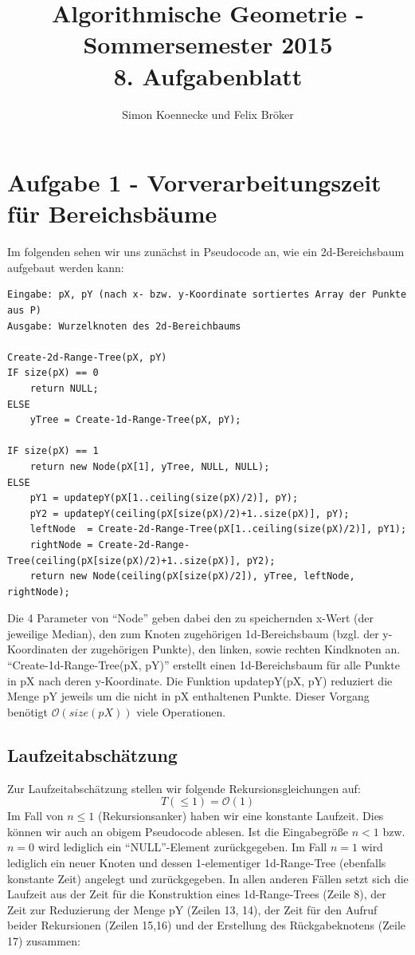 \documentclass[a4paper]{article}
\begin{document}
\title{Algorithmische Geometrie - Sommersemester 2015\\
       8. Aufgabenblatt }
\author{Simon Koennecke und Felix Bröker}
\date{}
\maketitle

\section*{Aufgabe 1 - Vorverarbeitungszeit für Bereichsbäume}

Im folgenden sehen wir uns zunächst in Pseudocode an, 
wie ein 2d-Bereichsbaum aufgebaut werden kann:

\begin{lstlisting}
Eingabe: pX, pY (nach x- bzw. y-Koordinate sortiertes Array der Punkte aus P)
Ausgabe: Wurzelknoten des 2d-Bereichbaums

Create-2d-Range-Tree(pX, pY)
IF size(pX) == 0
	return NULL;
ELSE
	yTree = Create-1d-Range-Tree(pX, pY);

IF size(pX) == 1
	return new Node(pX[1], yTree, NULL, NULL);
ELSE
	pY1 = updatepY(pX[1..ceiling(size(pX)/2)], pY);
	pY2 = updatepY(ceiling(pX[size(pX)/2)+1..size(pX)], pY);
	leftNode  = Create-2d-Range-Tree(pX[1..ceiling(size(pX)/2)], pY1);
	rightNode = Create-2d-Range-Tree(ceiling(pX[size(pX)/2)+1..size(pX)], pY2);
	return new Node(ceiling(pX[size(pX)/2]), yTree, leftNode, rightNode);
\end{lstlisting}

Die 4 Parameter von "`Node"' geben dabei den zu speichernden x-Wert (der jeweilige Median), 
den zum Knoten zugehörigen 1d-Bereichsbaum (bzgl. der y-Koordinaten der zugehörigen Punkte),
den linken, sowie rechten Kindknoten an. "`Create-1d-Range-Tree(pX, pY)"' erstellt einen 1d-Bereichsbaum für alle Punkte in pX nach deren y-Koordinate. 
Die Funktion updatepY(pX, pY) reduziert die Menge pY jeweils um die nicht in pX enthaltenen Punkte.
Dieser Vorgang benötigt $\mathcal{O}(size(pX))$ viele Operationen.

\subsection*{Laufzeitabschätzung}
Zur Laufzeitabschätzung stellen wir folgende Rekursionsgleichungen auf:
$$T(\leq 1) = \mathcal{O}(1)$$
Im Fall von $n \leq 1$ (Rekursionsanker) haben wir eine konstante Laufzeit.
Dies können wir auch an obigem Pseudocode ablesen. Ist die Eingabegröße $ n < 1$ bzw. $n = 0$
wird lediglich ein "`NULL"'-Element zurückgegeben. Im Fall $n = 1$ wird lediglich ein neuer Knoten
und dessen 1-elementiger 1d-Range-Tree (ebenfalls konstante Zeit) angelegt und zurückgegeben. 
In allen anderen Fällen setzt sich die Laufzeit aus der Zeit für die Konstruktion eines 1d-Range-Trees
(Zeile 8), der Zeit zur Reduzierung der Menge pY (Zeilen 13, 14), der Zeit für den Aufruf beider Rekursionen (Zeilen 15,16) und der Erstellung des Rückgabeknotens (Zeile 17) zusammen:
\end{document}
